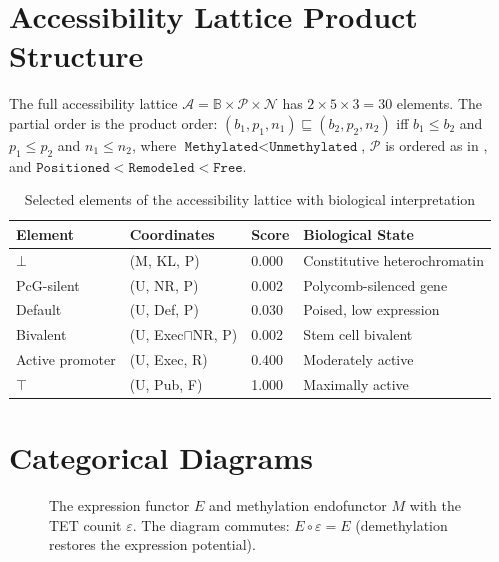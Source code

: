 \documentclass[12pt,a4paper]{article}
\newcommand{\Meth}{\texttt{Methylated}}
\newcommand{\Unmeth}{\texttt{Unmethylated}}
\newcommand{\cat}[1]{\mathbf{#1}}
\newcommand{\id}{\mathrm{id}}
\begin{document}
\section{Accessibility Lattice Product Structure}
\label{app:product}

The full accessibility lattice $\mathcal{A} = \mathbb{B} \times \mathcal{P} \times \mathcal{N}$ has $2 \times 5 \times 3 = 30$ elements. The partial order is the product order: $(b_1, p_1, n_1) \sqsubseteq (b_2, p_2, n_2)$ iff $b_1 \leq b_2$ and $p_1 \leq p_2$ and $n_1 \leq n_2$, where $\Meth < \Unmeth$, $\mathcal{P}$ is ordered as in , and $\texttt{Positioned} < \texttt{Remodeled} < \texttt{Free}$.

\begin{table}[H]
\centering
\caption{Selected elements of the accessibility lattice with biological interpretation}
\label{tab:acc-elements}
\begin{tabular}{lllp{5cm}}
\toprule
\textbf{Element} & \textbf{Coordinates} & \textbf{Score} & \textbf{Biological State} \\
\midrule
$\bot$ & (M, KL, P) & 0.000 & Constitutive heterochromatin \\
PcG-silent & (U, NR, P) & 0.002 & Polycomb-silenced gene \\
Default & (U, Def, P) & 0.030 & Poised, low expression \\
Bivalent & (U, Exec$\sqcap$NR, P) & 0.002 & Stem cell bivalent \\
Active promoter & (U, Exec, R) & 0.400 & Moderately active \\
$\top$ & (U, Pub, F) & 1.000 & Maximally active \\
\bottomrule
\end{tabular}
\end{table}

\section{Categorical Diagrams}
\label{app:cat-diagrams}

\begin{figure}[H]
\centering
{}
\caption{The expression functor $E$ and methylation endofunctor $M$ with the TET counit $\varepsilon$. The diagram commutes: $E \circ \varepsilon = E$ (demethylation restores the expression potential).}
\label{fig:E-M-commute}
\end{figure}
\end{document}
